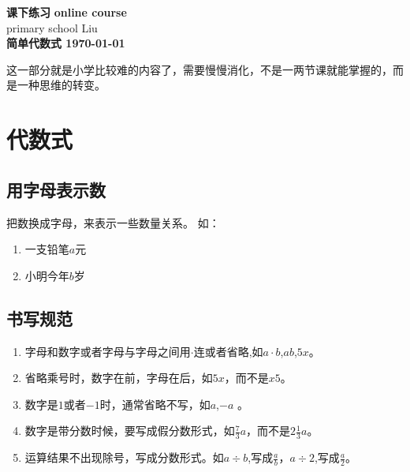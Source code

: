 \documentclass[DIN, pagenumber=false, fontsize=11pt, parskip=half]{scrartcl}
\newcommand{\mytitle}[1]{{\noindent\Large\textbf{#1}}}
\begin{document}
\noindent\textbf{课下练习} \hfill \textbf{online course}\\
primary school \hfill Liu\\

\mytitle{简单代数式 \hfill \today}
\newline
\begin{parchmentquote}
	这一部分就是小学比较难的内容了，需要慢慢消化，不是一两节课就能掌握的，而是一种思维的转变。
\end{parchmentquote}


\section{代数式}

\subsection{用字母表示数} 
把数换成字母，来表示一些数量关系。
如：

\begin{enumerate}
    \item 一支铅笔$a$元
    \item 小明今年$b$岁
\end{enumerate}
\subsection{书写规范} 
\begin{enumerate}
    \item 字母和数字或者字母与字母之间用$\cdot$连或者省略,如$a \cdot b$,$ab$,$5x$。
    \item 省略乘号时，数字在前，字母在后，如$5x$，而不是$x5$。
    \item 数字是$1$或者$-1$时，通常省略不写，如$a$,$-a$ 。
    \item 数字是带分数时候，要写成假分数形式，如$\frac{7}{3}a$，而不是$2\frac{1}{3}a$。 
    \item 运算结果不出现除号，写成分数形式。如$a \div b$,写成$\frac{a}{b}$，$a \div 2$,写成$\frac{a}{2}$。
\end{enumerate}
\end{document}
